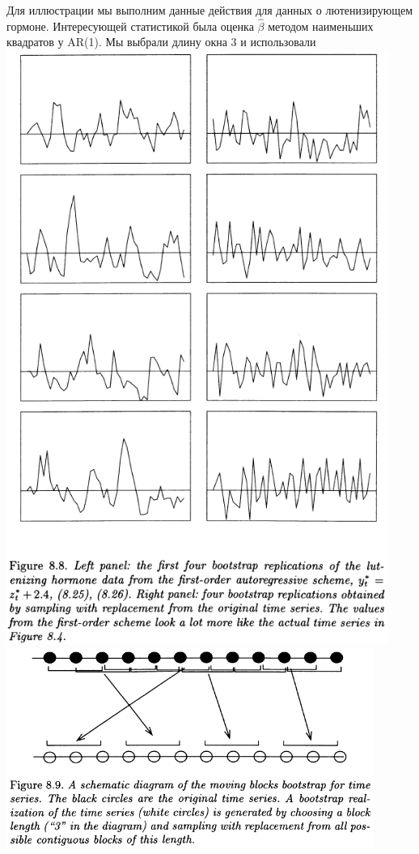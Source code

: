 \documentclass{report}
\begin{document}
Для иллюстрации мы выполним данные действия для данных о лютенизирующем гормоне. Интересующей статистикой была оценка $\hat \beta$ методом наименьших квадратов у AR(1). Мы выбрали длину окна $3$ и использовали\\ 
\includegraphics[width=12.5cm]{fig88}\\
\includegraphics[width=12cm]{fig89}\\
\end{document}
